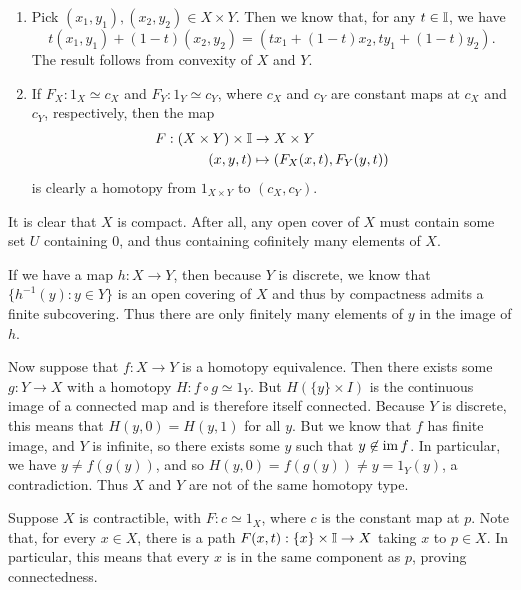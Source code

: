 \documentclass[../solutions.tex]{subfiles}
\begin{document}
\begin{exercise} \leavevmode
\begin{enumerate}
\item Pick $(x_1,y_1),(x_2,y_2)\in X\times Y$. Then we know that, for any $t\in\mathbb I$, we have \[t(x_1,y_1)+(1-t)(x_2,y_2)=(tx_1+(1-t)x_2,ty_1+(1-t)y_2).\] The result follows from convexity of $X$ and $Y$. 

\item If $F_X:1_X\simeq c_X$ and $F_Y:1_Y\simeq c_Y$, where $c_X$ and $c_Y$ are constant maps at $c_X$ and $c_Y$, respectively, then the map \begin{align*}F:(X\times Y)\times\mathbb I&\to X\times Y\\(x,y,t)&\mapsto(F_X(x,t),F_Y(y,t))\end{align*} is clearly a homotopy from $1_{X\times Y}$ to $(c_X,c_Y)$. 
\end{enumerate} 
\end{exercise} 

\begin{exercise} \leavevmode
It is clear that $X$ is compact. After all, any open cover of $X$ must contain some set $U$ containing 0, and thus containing cofinitely many elements of $X$. 

If we have a map $h:X\to Y$, then because $Y$ is discrete, we know that $\{h^{-1}(y):y\in Y\}$ is an open covering of $X$ and thus by compactness admits a finite subcovering. Thus there are only finitely many elements of $y$ in the image of $h$. 

Now suppose that $f:X\to Y$ is a homotopy equivalence. Then there exists some $g:Y\to X$ with a homotopy $H:f\circ g\simeq1_Y$. But $H(\{y\}\times I)$ is the continuous image of a connected map and is therefore itself connected. Because $Y$ is discrete, this means that $H(y,0)=H(y,1)$ for all $y$. But we know that $f$ has finite image, and $Y$ is infinite, so there exists some $y$ such that $y\not\in\operatorname{im} f$. In particular, we have $y\ne f(g(y))$, and so $H(y,0)=f(g(y))\ne y=1_Y(y)$, a contradiction. Thus $X$ and $Y$ are not of the same homotopy type. 
\end{exercise} 

\begin{exercise} \leavevmode
Suppose $X$ is contractible, with $F:c\simeq1_X$, where $c$ is the constant map at $p$. Note that, for every $x\in X$, there is a path $F(x,t):\{x\}\times\mathbb I\to X$ taking $x$ to $p\in X$. In particular, this means that every $x$ is in the same component as $p$, proving connectedness. 
\end{exercise} 
\end{document}
